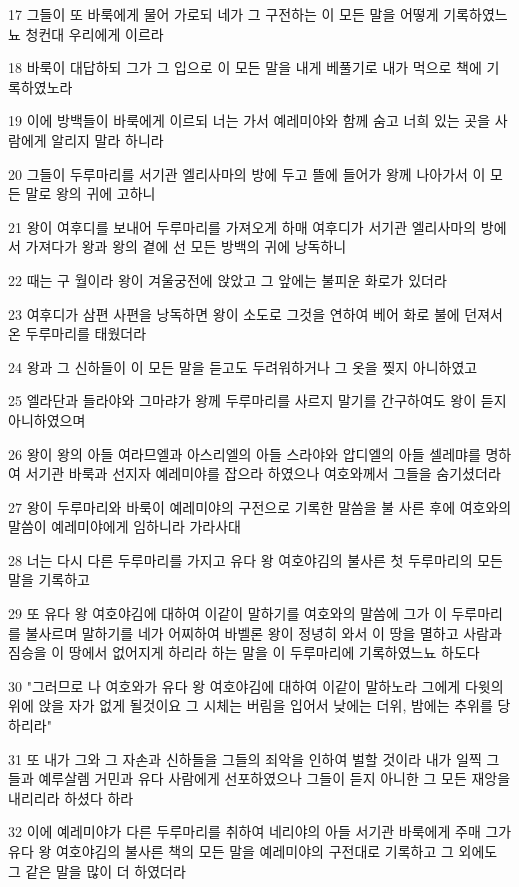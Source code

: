 \par 17 그들이 또 바룩에게 물어 가로되 네가 그 구전하는 이 모든 말을 어떻게 기록하였느뇨 청컨대 우리에게 이르라
\par 18 바룩이 대답하되 그가 그 입으로 이 모든 말을 내게 베풀기로 내가 먹으로 책에 기록하였노라
\par 19 이에 방백들이 바룩에게 이르되 너는 가서 예레미야와 함께 숨고 너희 있는 곳을 사람에게 알리지 말라 하니라
\par 20 그들이 두루마리를 서기관 엘리사마의 방에 두고 뜰에 들어가 왕께 나아가서 이 모든 말로 왕의 귀에 고하니
\par 21 왕이 여후디를 보내어 두루마리를 가져오게 하매 여후디가 서기관 엘리사마의 방에서 가져다가 왕과 왕의 곁에 선 모든 방백의 귀에 낭독하니
\par 22 때는 구 월이라 왕이 겨울궁전에 앉았고 그 앞에는 불피운 화로가 있더라
\par 23 여후디가 삼편 사편을 낭독하면 왕이 소도로 그것을 연하여 베어 화로 불에 던져서 온 두루마리를 태웠더라
\par 24 왕과 그 신하들이 이 모든 말을 듣고도 두려워하거나 그 옷을 찢지 아니하였고
\par 25 엘라단과 들라야와 그마랴가 왕께 두루마리를 사르지 말기를 간구하여도 왕이 듣지 아니하였으며
\par 26 왕이 왕의 아들 여라므엘과 아스리엘의 아들 스라야와 압디엘의 아들 셀레먀를 명하여 서기관 바룩과 선지자 예레미야를 잡으라 하였으나 여호와께서 그들을 숨기셨더라
\par 27 왕이 두루마리와 바룩이 예레미야의 구전으로 기록한 말씀을 불 사른 후에 여호와의 말씀이 예레미야에게 임하니라 가라사대
\par 28 너는 다시 다른 두루마리를 가지고 유다 왕 여호야김의 불사른 첫 두루마리의 모든 말을 기록하고
\par 29 또 유다 왕 여호야김에 대하여 이같이 말하기를 여호와의 말씀에 그가 이 두루마리를 불사르며 말하기를 네가 어찌하여 바벨론 왕이 정녕히 와서 이 땅을 멸하고 사람과 짐승을 이 땅에서 없어지게 하리라 하는 말을 이 두루마리에 기록하였느뇨 하도다
\par 30 "그러므로 나 여호와가 유다 왕 여호야김에 대하여 이같이 말하노라 그에게 다윗의 위에 앉을 자가 없게 될것이요 그 시체는 버림을 입어서 낮에는 더위, 밤에는 추위를 당하리라"
\par 31 또 내가 그와 그 자손과 신하들을 그들의 죄악을 인하여 벌할 것이라 내가 일찍 그들과 예루살렘 거민과 유다 사람에게 선포하였으나 그들이 듣지 아니한 그 모든 재앙을 내리리라 하셨다 하라
\par 32 이에 예레미야가 다른 두루마리를 취하여 네리야의 아들 서기관 바룩에게 주매 그가 유다 왕 여호야김의 불사른 책의 모든 말을 예레미야의 구전대로 기록하고 그 외에도 그 같은 말을 많이 더 하였더라

